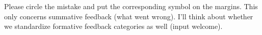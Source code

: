 \noindent Please circle the mistake and put the corresponding symbol on the margins. This only concerns summative feedback (what went wrong). I'll think about whether we standardize formative feedback categories as well (input welcome).


